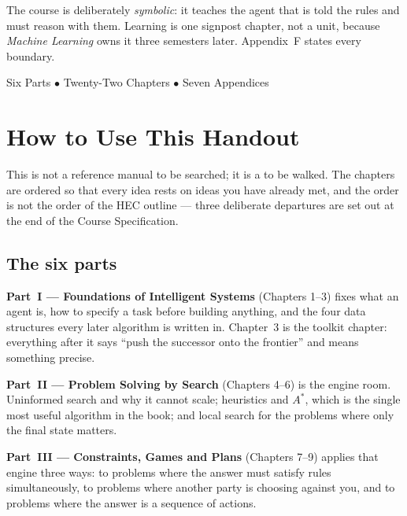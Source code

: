 \begin{center}
\begin{tcolorbox}[enhanced, width=0.86\textwidth, colback=lightbg,
  colframe=primary, boxrule=0pt, leftrule=4pt, arc=2pt, top=6pt, bottom=6pt]
\smallskip
The course is deliberately \emph{symbolic}: it teaches the agent that is told the
rules and must reason with them. Learning is one signpost chapter, not a unit,
because \emph{Machine Learning} owns it three semesters later. Appendix~F states
every boundary.
\end{tcolorbox}

\vspace{1.0cm}
{\small\color{gray!60!black}Six Parts $\bullet$ Twenty-Two Chapters $\bullet$ Seven Appendices}
\vspace{1cm}
\end{center}

\newpage

\chapter*{How to Use This Handout}

This is not a reference manual to be searched; it is a  to be walked.
The chapters are ordered so that every idea rests on ideas you have already met,
and the order is not the order of the HEC outline --- three deliberate departures
are set out at the end of the Course Specification.

\section*{The six parts}

\textbf{Part~I --- Foundations of Intelligent Systems} (Chapters 1--3) fixes what
an agent is, how to specify a task before building anything, and the four data
structures every later algorithm is written in. Chapter~3 is the toolkit chapter:
everything after it says ``push the successor onto the frontier'' and means
something precise.

\textbf{Part~II --- Problem Solving by Search} (Chapters 4--6) is the engine room.
Uninformed search and why it cannot scale; heuristics and $A^{*}$, which is the
single most useful algorithm in the book; and local search for the problems where
only the final state matters.

\textbf{Part~III --- Constraints, Games and Plans} (Chapters 7--9) applies that
engine three ways: to problems where the answer must satisfy rules simultaneously,
to problems where another party is choosing against you, and to problems where the
answer is a sequence of actions.

